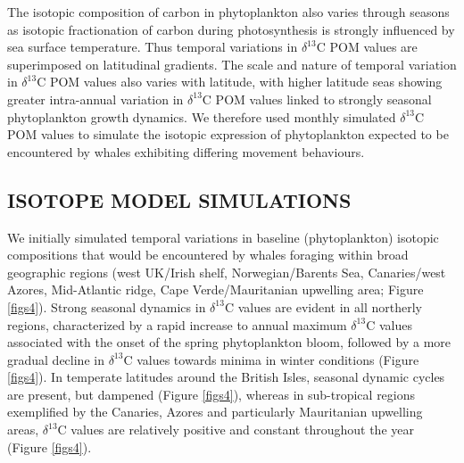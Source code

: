 \documentclass[a4paper,10pt]{article}
\begin{document}
The isotopic composition of carbon in phytoplankton also varies through seasons as isotopic fractionation of carbon during photosynthesis is strongly influenced by sea surface temperature\cite{laws1995dependence}. 
Thus temporal variations in $\delta^{13}$C POM values are superimposed on latitudinal gradients. 
The scale and nature of temporal variation in $\delta^{13}$C POM values also varies with latitude, with higher latitude seas showing greater intra-annual variation in $\delta^{13}$C POM values linked to strongly seasonal phytoplankton growth dynamics. 
We therefore used monthly simulated $\delta^{13}$C POM values to simulate the isotopic expression of phytoplankton expected to be encountered by whales exhibiting differing movement behaviours.
 
\subsection*{ISOTOPE MODEL SIMULATIONS}
We initially simulated temporal variations in baseline (phytoplankton) isotopic compositions that would be encountered by whales foraging within broad geographic regions (west UK/Irish shelf, Norwegian/Barents Sea, Canaries/west Azores, Mid-Atlantic ridge, Cape Verde/Mauritanian upwelling area; Figure \ref{figs4}). 
Strong seasonal dynamics in $\delta^{13}$C values are evident in all northerly regions, characterized by a rapid increase to annual maximum $\delta^{13}$C values associated with the onset of the spring phytoplankton bloom, followed by a more gradual decline in $\delta^{13}$C values towards minima in winter conditions (Figure \ref{figs4}). 
In temperate latitudes around the British Isles, seasonal dynamic cycles are present, but dampened (Figure \ref{figs4}), whereas in sub-tropical regions exemplified by the Canaries, Azores and particularly Mauritanian upwelling areas, $\delta^{13}$C values are relatively positive and constant throughout the year (Figure \ref{figs4}).
 
\end{document}
